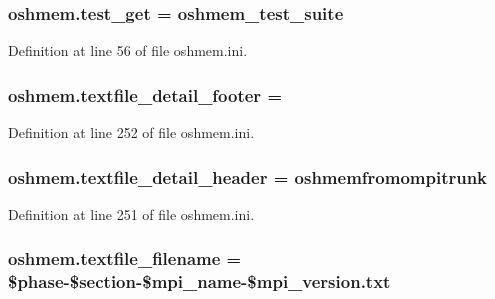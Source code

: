 \hypertarget{namespaceoshmem_aeaeee2752ca66a1f9aad1ec10e9f62e7}{
\subsubsection[{test\-\_\-get}]{\setlength{\rightskip}{0pt plus 5cm}oshmem.\-test\-\_\-get = oshmem\-\_\-test\-\_\-suite}}\label{namespaceoshmem_aeaeee2752ca66a1f9aad1ec10e9f62e7}


Definition at line 56 of file oshmem.\-ini.

\hypertarget{namespaceoshmem_aec7f6285615e309f4d179fde03e40d8e}{
\subsubsection[{textfile\-\_\-detail\-\_\-footer}]{\setlength{\rightskip}{0pt plus 5cm}oshmem.\-textfile\-\_\-detail\-\_\-footer =}}\label{namespaceoshmem_aec7f6285615e309f4d179fde03e40d8e}


Definition at line 252 of file oshmem.\-ini.

\hypertarget{namespaceoshmem_ae5a0095596c3624c7f19ae771452c5d3}{
\subsubsection[{textfile\-\_\-detail\-\_\-header}]{\setlength{\rightskip}{0pt plus 5cm}oshmem.\-textfile\-\_\-detail\-\_\-header = oshmemfromompitrunk}}\label{namespaceoshmem_ae5a0095596c3624c7f19ae771452c5d3}


Definition at line 251 of file oshmem.\-ini.

\hypertarget{namespaceoshmem_ab7bec292d903dc1e22f6dd1610ac9aad}{
\subsubsection[{textfile\-\_\-filename}]{\setlength{\rightskip}{0pt plus 5cm}oshmem.\-textfile\-\_\-filename = \$phase-\/\$section-\/\$mpi\-\_\-name-\/\$mpi\-\_\-version.\-txt}}\label{namespaceoshmem_ab7bec292d903dc1e22f6dd1610ac9aad}


